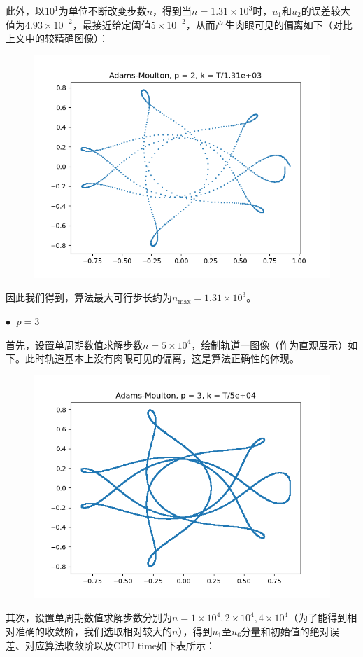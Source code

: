 \documentclass{ctexart}
\begin{document}
\begin{sloppypar}
此外，以$10^1$为单位不断改变步数$n$，得到当$n = 1.31 \times 10^3$时，$u_1$和$u_2$的误差较大值为$4.93 \times 10^{-2}$，最接近给定阈值$5 \times 10^{-2}$，从而产生肉眼可见的偏离如下（对比上文中的较精确图像）：
\begin{figure}[H]
\centering
\includegraphics[scale = 0.45]{./report_src/Figure_49.png}
\end{figure}
因此我们得到，算法最大可行步长约为$n_{\max} = 1.31 \times 10^3$。

$\bullet \;$ $p = 3$

首先，设置单周期数值求解步数$n = 5 \times 10^4$，绘制轨道一图像（作为直观展示）如下。此时轨道基本上没有肉眼可见的偏离，这是算法正确性的体现。
\begin{figure}[H]
\centering
\includegraphics[scale = 0.45]{./report_src/Figure_50.png}
\end{figure}
其次，设置单周期数值求解步数分别为$n = 1 \times 10^4,2 \times 10^4,4 \times 10^4$（为了能得到相对准确的收敛阶，我们选取相对较大的$n$），得到$u_1$至$u_6$分量和初始值的绝对误差、对应算法收敛阶以及CPU time如下表所示：


\end{sloppypar}
\end{document}
